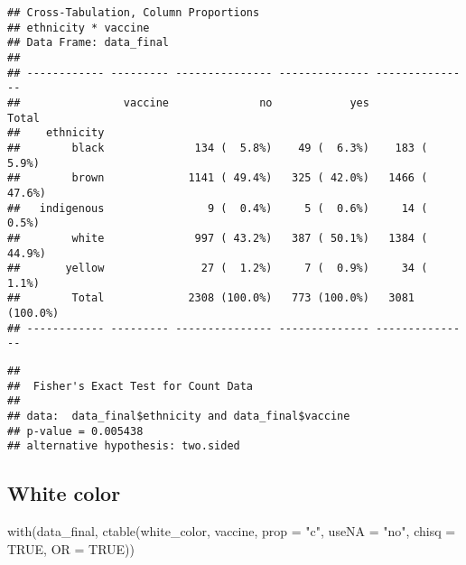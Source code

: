 \documentclass[
]{article}
\newenvironment{Shaded}{\begin{snugshade}}{\end{snugshade}}
\newcommand{\AttributeTok}[1]{\textcolor[rgb]{0.77,0.63,0.00}{#1}}
\newcommand{\ConstantTok}[1]{\textcolor[rgb]{0.00,0.00,0.00}{#1}}
\newcommand{\FunctionTok}[1]{\textcolor[rgb]{0.00,0.00,0.00}{#1}}
\newcommand{\NormalTok}[1]{#1}
\newcommand{\SpecialCharTok}[1]{\textcolor[rgb]{0.00,0.00,0.00}{#1}}
\newcommand{\StringTok}[1]{\textcolor[rgb]{0.31,0.60,0.02}{#1}}
\begin{document}
\begin{verbatim}
## Cross-Tabulation, Column Proportions  
## ethnicity * vaccine  
## Data Frame: data_final  
## 
## ------------ --------- --------------- -------------- ---------------
##                vaccine              no            yes           Total
##    ethnicity                                                         
##        black              134 (  5.8%)    49 (  6.3%)    183 (  5.9%)
##        brown             1141 ( 49.4%)   325 ( 42.0%)   1466 ( 47.6%)
##   indigenous                9 (  0.4%)     5 (  0.6%)     14 (  0.5%)
##        white              997 ( 43.2%)   387 ( 50.1%)   1384 ( 44.9%)
##       yellow               27 (  1.2%)     7 (  0.9%)     34 (  1.1%)
##        Total             2308 (100.0%)   773 (100.0%)   3081 (100.0%)
## ------------ --------- --------------- -------------- ---------------
\end{verbatim}

\begin{Shaded}
\end{Shaded}

\begin{verbatim}
## 
##  Fisher's Exact Test for Count Data
## 
## data:  data_final$ethnicity and data_final$vaccine
## p-value = 0.005438
## alternative hypothesis: two.sided
\end{verbatim}

\hypertarget{white-color}{%
\subsection{White color}\label{white-color}}

\begin{Shaded}
\begin{Highlighting}[]
\FunctionTok{with}\NormalTok{(data\_final, }\FunctionTok{ctable}\NormalTok{(white\_color, vaccine,  }\AttributeTok{prop =} \StringTok{"c"}\NormalTok{, }\AttributeTok{useNA =} \StringTok{"no"}\NormalTok{, }\AttributeTok{chisq =} \ConstantTok{TRUE}\NormalTok{, }\AttributeTok{OR =} \ConstantTok{TRUE}\NormalTok{))}
\end{Highlighting}
\end{Shaded}
\end{document}
